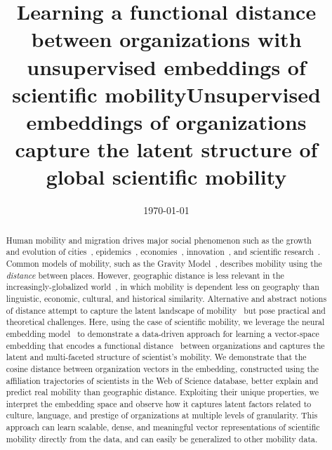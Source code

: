 \documentclass[12pt]{article} %
\begin{document}
\title{Learning a functional distance between organizations with unsupervised embeddings of scientific mobility}
\title{Unsupervised embeddings of organizations capture the latent structure of global scientific mobility} %
\date{\today}
\maketitle %

%
%

\begin{abstract}


Human mobility and migration drives major social phenomenon such as the growth and evolution of cities~\autocite{wef2017migration, curiel2018citygravity},  epidemics~\autocite{kraemer2020covid, truscott2012epidemicgravity, xia2005measlesgravity}, economies~\autocite{kaluza2010cargo, kerr2011immigration}, innovation~\autocite{kaiser2018innovation, armano2017innovation},  and scientific research~\autocite{sugimoto2017mostimpact, petersen2018multiscale, franzoni2014advantage, morgan2018prestige, rodrigues2016mobility}. 
Common models of mobility, such as the Gravity Model~\autocite{zipf1946gravity, xia2005measlesgravity, jung2008highwaygravity, barbosa2018human, curiel2018citygravity, lewer2008immigrationgravity, hong2016busgravity, truscott2012epidemicgravity, xia2005measlesgravity}, describes mobility using the \textit{distance} between places.
However, geographic distance is less relevant in the increasingly-globalized world~\autocite{czaika2018migration, czaika2018globalisation, buchan2009globalization}, in which mobility is dependent less on geography than linguistic, economic, cultural, and historical similarity. 
Alternative and abstract notions of distance attempt to capture the latent landscape of mobility~\autocite{boschma2005proximity,  brown1970functional, brown1970migration, kim2018functional} but pose practical and theoretical challenges. 
Here, using the case of scientific mobility, we leverage the neural embedding model~\autocite{mikolov2013word2vec} to demonstrate a data-driven approach for learning a vector-space embedding that encodes a functional distance~\autocite{brown1970migration, brown1970functional, kim2018functional} between organizations and captures the latent and multi-faceted structure of scientist's mobility.
We demonstrate that the cosine distance between organization vectors in the embedding, constructed using the affiliation trajectories of scientists in the Web of Science database, better explain and predict real mobility than geographic distance. 
Exploiting their unique properties, we interpret the embedding space and observe how it captures latent factors related to culture, language, and prestige of organizations at multiple levels of granularity.
This approach can learn scalable, dense, and meaningful vector representations of scientific mobility directly from the data, and can easily be generalized to other mobility data.

\end{abstract}
\end{document}
